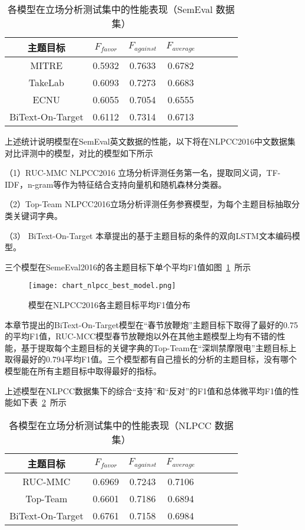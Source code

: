 \begin{table}[htbp]
	\caption[table123]{各模型在立场分析测试集中的性能表现（SemEval 数据集）}
	\vspace{0.5em}\centering\wuhao
	\label{semeval_res}
	\begin{tabular}{cccccccc}
		\toprule[1.5pt]
		主题目标& $F_{favor}$&$F_{against}$&$F_{average}$ \\
		\midrule[1pt]
		MITRE&0.5932&0.7633&0.6782\\
		TakeLab&0.6093&0.7273&0.6683\\
		ECNU&0.6055&0.7054&0.6555\\
		BiText-On-Target&0.6112&0.7314&0.6713\\
		\bottomrule[1.5pt]
	\end{tabular}
\end{table}

上述统计说明模型在SemEval英文数据的性能，以下将在NLPCC2016中文数据集对比评测中的模型，对比的模型如下所示

（1）RUC-MMC NLPCC2016 立场分析评测任务第一名，提取同义词，TF-IDF，n-gram等作为特征结合支持向量机和随机森林分类器。

（2）Top-Team NLPCC2016立场分析评测任务参赛模型，为每个主题目标抽取分类关键词字典。

（3） BiText-On-Target 本章提出的基于主题目标的条件的双向LSTM文本编码模型。

三个模型在SemeEval2016的各主题目标下单个平均F1值如图~\ref{chart_nlpcc_best_model}~所示
\begin{figure}[htbp]
	\centering
	\texttt{[image: chart\_nlpcc\_best\_model.png]}
	\caption[rnn_vanish]{模型在NLPCC2016各主题目标平均F1值分布}
	\label{chart_nlpcc_best_model}
\end{figure}

本章节提出的BiText-On-Target模型在“春节放鞭炮”主题目标下取得了最好的0.75的平均F1值，RUC-MCC模型春节放鞭炮以外在其他主题模型上均有不错的性能，基于提取每个主题目标的关键字典的Top-Team在“深圳禁摩限电”主题目标上取得最好的0.794平均F1值。三个模型都有自己擅长的分析的主题目标，没有哪个模型能在所有主题目标中取得最好的指标。

上述模型在NLPCC数据集下的综合“支持”和“反对”的F1值和总体微平均F1值的性能如下表~\ref{nlpcc_res}~所示
\begin{table}[htbp]
	\caption[table123]{各模型在立场分析测试集中的性能表现（NLPCC 数据集）}
	\label{nlpcc_res}
	\vspace{0.5em}\centering\wuhao
	\begin{tabular}{cccccccc}
		\toprule[1.5pt]
		主题目标& $F_{favor}$&$F_{against}$&$F_{average}$ \\
		\midrule[1pt]
		RUC-MMC&0.6969&0.7243&0.7106\\
		Top-Team&0.6601&0.7186&0.6894\\
		BiText-On-Target&0.6761&0.7158&0.6984\\
		\bottomrule[1.5pt]
	\end{tabular}
\end{table}

